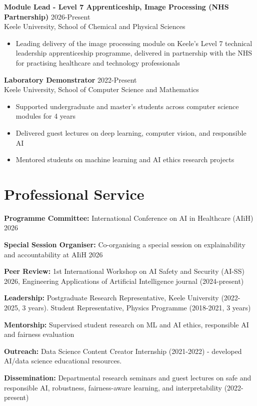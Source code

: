 \documentclass[10pt,a4paper]{article}
\begin{document}
\textbf{Module Lead - Level 7 Apprenticeship, Image Processing (NHS Partnership)} \hfill 2026-Present\\
Keele University, School of Chemical and Physical Sciences
\begin{itemize}
\item Leading delivery of the image processing module on Keele's Level 7 technical leadership apprenticeship programme, delivered in partnership with the NHS for practising healthcare and technology professionals
\end{itemize}

\textbf{Laboratory Demonstrator} \hfill 2022-Present\\
Keele University, School of Computer Science and Mathematics
\begin{itemize}
\item Supported undergraduate and master's students across computer science modules for 4 years
\item Delivered guest lectures on deep learning, computer vision, and responsible AI
\item Mentored students on machine learning and AI ethics research projects
\end{itemize}

\section{Professional Service}

\textbf{Programme Committee:} International Conference on AI in Healthcare (AIiH) 2026

\textbf{Special Session Organiser:} Co-organising a special session on explainability and accountability at AIiH 2026

\textbf{Peer Review:} 1st International Workshop on AI Safety and Security (AI-SS) 2026, Engineering Applications of Artificial Intelligence journal (2024-present)

\textbf{Leadership:} Postgraduate Research Representative, Keele University (2022-2025, 3 years). Student Representative, Physics Programme (2018-2021, 3 years)

\textbf{Mentorship:} Supervised student research on ML and AI ethics, responsible AI and fairness evaluation

\textbf{Outreach:} Data Science Content Creator Internship (2021-2022) - developed AI/data science educational resources.

\textbf{Dissemination:} Departmental research seminars and guest lectures on safe and responsible AI, robustness, fairness-aware learning, and interpretability (2022-present)
\end{document}
